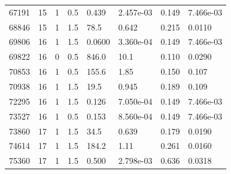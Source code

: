 \documentclass[preview]{standalone}
\begin{document}
{{{\begin{tabular}{L{1.2cm}C{1.2cm} C{0.3cm}C{0.5cm} C{1.4cm}C{1.4cm} C{1.4cm}C{1.4cm}}
  67191  &    15  & 1     & 0.5 &  0.439  & 2.457e-03  & 0.149 &  7.466e-03   \\ 
  68846  &    15  & 1     & 1.5 &  78.5  & 0.642  & 0.215 &  0.0110   \\ 
  69806  &    16  & 1     & 1.5 &  0.0600  & 3.360e-04  & 0.149 &  7.466e-03   \\ 
  69822  &    16  & 0     & 0.5 &  846.0  & 10.1  & 0.110 &  0.0290   \\ 
  70853  &    16  & 1     & 0.5 &  155.6  & 1.85  & 0.150 &  0.107   \\ 
  70938  &    16  & 1     & 1.5 &  19.5  & 0.945  & 0.189 &  0.109   \\ 
  72295  &    16  & 1     & 1.5 &  0.126  & 7.050e-04  & 0.149 &  7.466e-03   \\ 
  73527  &    16  & 1     & 0.5 &  0.153  & 8.560e-04  & 0.149 &  7.466e-03   \\ 
  73860  &    17  & 1     & 1.5 &  34.5  & 0.639  & 0.179 &  0.0190   \\ 
  74614  &    17  & 1     & 1.5 &  184.2  & 1.11  & 0.261 &  0.0160   \\ 
  75360  &    17  & 1     & 1.5 &  0.500  & 2.798e-03  & 0.636 &  0.0318   \\ 
\hline 
\end{tabular} 

}}}
\end{document}
